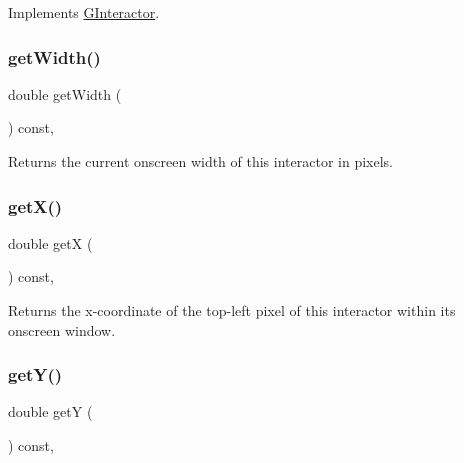 Implements \mbox{\hyperlink{classGInteractor}{G\+Interactor}}.

\mbox{\label{classGInteractor_a0ed2965abd4f5701d2cadf71239faf19}} 
\subsubsection{\texorpdfstring{get\+Width()}{getWidth()}}
{\footnotesize\ttfamily double get\+Width (\begin{DoxyParamCaption}{ }\end{DoxyParamCaption}) const\hspace{0.3cm}{\ttfamily [virtual]}, {\ttfamily [inherited]}}



Returns the current onscreen width of this interactor in pixels. 

\mbox{\label{classGInteractor_a344385751bee0720059403940d57a13e}} 
\subsubsection{\texorpdfstring{get\+X()}{getX()}}
{\footnotesize\ttfamily double getX (\begin{DoxyParamCaption}{ }\end{DoxyParamCaption}) const\hspace{0.3cm}{\ttfamily [virtual]}, {\ttfamily [inherited]}}



Returns the x-\/coordinate of the top-\/left pixel of this interactor within its onscreen window. 

\mbox{\label{classGInteractor_aafa51c7f8f38a09febbb9ce7853f77b4}} 
\subsubsection{\texorpdfstring{get\+Y()}{getY()}}
{\footnotesize\ttfamily double getY (\begin{DoxyParamCaption}{ }\end{DoxyParamCaption}) const\hspace{0.3cm}{\ttfamily [virtual]}, {\ttfamily [inherited]}}



